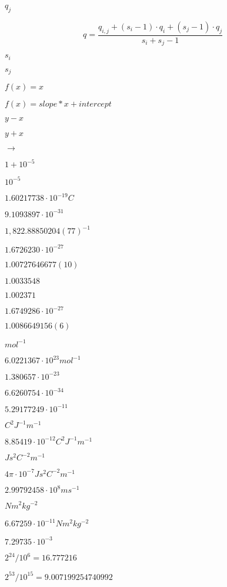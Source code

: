 \documentclass{article}
\begin{document}
$ q_j $
\pagebreak

\[ q = \frac{q_{i,j} + (s_i - 1) \cdot q_i + (s_j - 1) \cdot q_j}{s_i + s_j - 1} \]
\pagebreak

$ s_i $
\pagebreak

$ s_j $
\pagebreak

$ f(x) = x $
\pagebreak

$ f(x) = slope * x + intercept $
\pagebreak

$ y - x $
\pagebreak

$ y + x $
\pagebreak

$ \longrightarrow $
\pagebreak

$ 1 + 10^{-5} $
\pagebreak

$ 10^{-5} $
\pagebreak

$1.60217738 \cdot 10^{-19} C$
\pagebreak

$9.1093897 \cdot 10^{-31}$
\pagebreak

$1,822.88850204(77)^{-1}$
\pagebreak

$1.6726230 \cdot 10^{-27}$
\pagebreak

$1.00727646677(10)$
\pagebreak

$1.0033548$
\pagebreak

$1.002371$
\pagebreak

$1.6749286 \cdot 10^{-27}$
\pagebreak

$1.0086649156(6)$
\pagebreak

$mol^{-1}$
\pagebreak

$6.0221367 \cdot 10^{23} mol^{-1}$
\pagebreak

$1.380657 \cdot 10^{-23}$
\pagebreak

$6.6260754 \cdot 10^{-34}$
\pagebreak

$5.29177249 \cdot 10^{-11}$
\pagebreak

$C^2J^{-1}m^{-1}$
\pagebreak

$8.85419 \cdot 10^{-12} C^2J^{-1}m^{-1}$
\pagebreak

$Js^2C^{-2}m^{-1}$
\pagebreak

$4\pi \cdot 10^{-7} Js^2C^{-2}m^{-1}$
\pagebreak

$2.99792458 \cdot 10^8 ms^{-1}$
\pagebreak

$Nm^2kg^{-2}$
\pagebreak

$6.67259 \cdot 10^{-11} Nm^2kg^{-2}$
\pagebreak

$7.29735 \cdot 10^{-3}$
\pagebreak

$2^{24}/10^{6}=16.777216$
\pagebreak

$2^{53}/10^{15}=9.007199254740992$
\pagebreak
\end{document}
